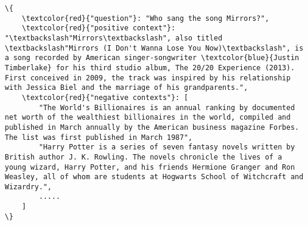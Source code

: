 \documentclass[preview,border=10pt]{standalone}
\begin{document}
\begin{minipage}{20cm}
\begin{Verbatim}[commandchars=\\\{\}, breaklines=true, breakanywhere=true]
\{
	\textcolor{red}{"question"}: "Who sang the song Mirrors?",
	\textcolor{red}{"positive context"}: "\textbackslash"Mirrors\textbackslash", also titled \textbackslash"Mirrors (I Don't Wanna Lose You Now)\textbackslash", is a song recorded by American singer-songwriter \textcolor{blue}{Justin Timberlake} for his third studio album, The 20/20 Experience (2013). First conceived in 2009, the track was inspired by his relationship with Jessica Biel and the marriage of his grandparents.",
	\textcolor{red}{"negative contexts"}: [
		"The World's Billionaires is an annual ranking by documented net worth of the wealthiest billionaires in the world, compiled and published in March annually by the American business magazine Forbes. The list was first published in March 1987",
		"Harry Potter is a series of seven fantasy novels written by British author J. K. Rowling. The novels chronicle the lives of a young wizard, Harry Potter, and his friends Hermione Granger and Ron Weasley, all of whom are students at Hogwarts School of Witchcraft and Wizardry.",
		.....
	]
\}
\end{Verbatim}
\end{minipage}
\end{document}
